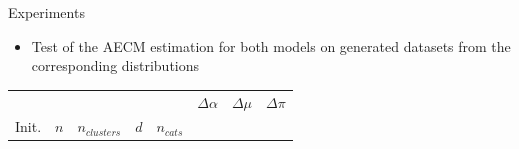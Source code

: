 \documentclass{beamer}
\begin{document}
\begin{frame}{Experiments}
    \begin{itemize}
        \item Test of the AECM estimation for both models on generated datasets from the corresponding distributions
    \end{itemize}

    \begin{table}[H]
        \centering
        \begin{minipage}{.48\columnwidth}
            \centering
            \begin{adjustbox}{width=\columnwidth}
                \begin{tabular}{lllllrrr}
                                                &                         &                       &                       &            & $\Delta \alpha$ & $\Delta \mu$ & $\Delta \pi$ \\
                    Init.                       & $n$                     & $n_{clusters}$        & $d$                   & $n_{cats}$ &                 &              &              \\


\end{tabular}
\end{adjustbox}
\end{minipage}
\end{table}
\end{frame}
\end{document}
